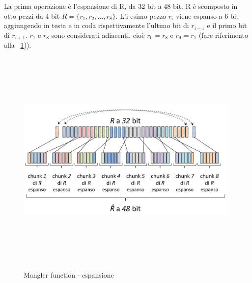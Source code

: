 La prima operazione è l'espansione di R, da 32 bit a 48 bit. R è scomposto in otto pezzi da 4 bit $R = \lbrace r_{1} , r_{2}, ..., r_{8} \rbrace$. L'i-esimo pezzo $r_{i}$ viene espanso a 6 bit aggiungendo in testa e in coda rispettivamente l'ultimo bit di $r_{i-1}$ e il primo bit di $r_{i+1}$. $r_{1}$ e $r_{8}$ sono considerati adiacenti, cioè $r_{0} = r_{8}$ e $r_{9} = r_{1}$ (fare riferimento alla \figurename ~\ref{fig:mangler_exp})).
\begin{figure}[htbp]
	\centering%
	\subfigure%
	{\includegraphics[height=11cm, width=11cm, keepaspectratio]{Immagini/chiave_segreta/mangler_exp.png}}
	\caption{Mangler function - espansione \label{fig:mangler_exp}} 	
\end{figure}
\newline

